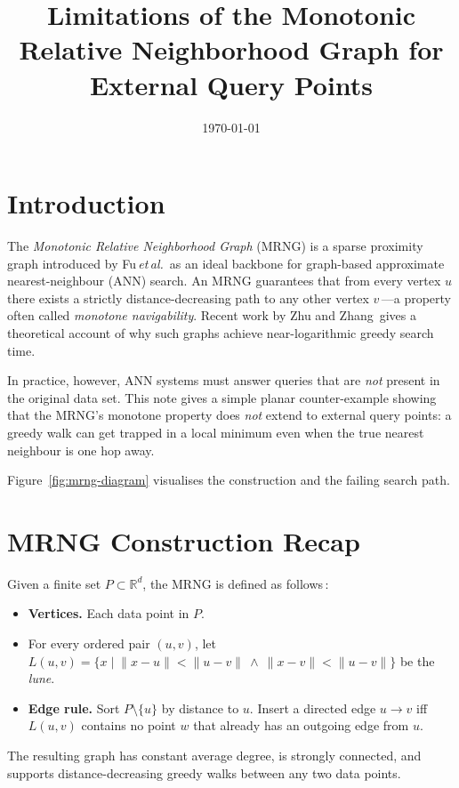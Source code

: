 \documentclass{article}
\title{Limitations of the Monotonic Relative Neighborhood Graph for External Query Points}
\author{}
\date{\today}
\newcommand{\dist}[2]{\lVert #1-#2\rVert}
\begin{document}
\maketitle

\section{Introduction}
The \emph{Monotonic Relative Neighborhood Graph} (MRNG) is a sparse proximity graph introduced by Fu\,\textit{et\,al.}\,\cite{fu2017nsg} as an ideal backbone for graph\hyp based approximate nearest\hyp neighbour (ANN) search. An MRNG guarantees that from every vertex $u$ there exists a strictly distance\hyp decreasing path to any other vertex $v$\,---a property often called \emph{monotone navigability}. Recent work by Zhu and Zhang\,\cite{zhu2021mrng} gives a theoretical account of why such graphs achieve near\hyp logarithmic greedy search time.

In practice, however, ANN systems must answer queries that are \emph{not} present in the original data set. This note gives a simple planar counter\hyp example showing that the MRNG's monotone property does \emph{not} extend to external query points: a greedy walk can get trapped in a local minimum even when the true nearest neighbour is one hop away.

Figure~\ref{fig:mrng-diagram} visualises the construction and the failing search path.

\section{MRNG Construction Recap}
Given a finite set $P\subset\mathbb R^{d}$, the MRNG is defined as follows\,\cite{fu2017nsg}:
\begin{itemize}
  \item \textbf{Vertices.} Each data point in $P$.
  \item For every ordered pair $(u,v)$, let $L(u,v)=\{x\mid \dist{x}{u}<\dist{u}{v}\ \wedge\ \dist{x}{v}<\dist{u}{v}\}$ be the \emph{lune}.
  \item \textbf{Edge rule.} Sort $P\setminus\{u\}$ by distance to $u$. Insert a directed edge $u\rightarrow v$ iff $L(u,v)$ contains no point $w$ that already has an outgoing edge from $u$.
\end{itemize}
The resulting graph has constant average degree, is strongly connected, and supports distance\hyp decreasing greedy walks between any two data points.
\end{document}
